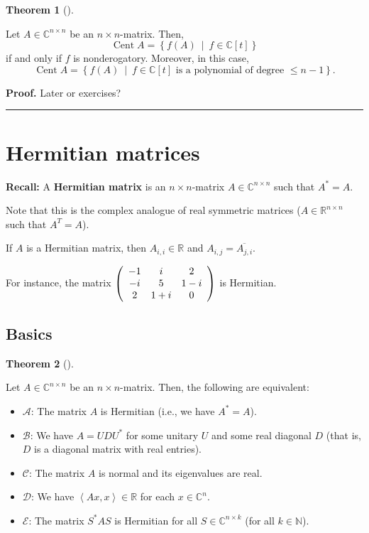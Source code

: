 \documentclass[numbers=enddot,12pt,final,onecolumn,notitlepage]{scrartcl}%
\newcounter{exer}
\numberwithin{exer}{subsection}
\theoremstyle{definition}
\newtheorem{theo}{Theorem}[subsection]
\newenvironment{theorem}[1][]
{\begin{theo}[#1]\begin{leftbar}}
{\end{leftbar}\end{theo}}
\newenvironment{proof}[1][Proof]{\noindent\textbf{#1.} }{\ \rule{0.5em}{0.5em}}
\begin{document}
\begin{theorem}
Let $A\in\mathbb{C}^{n\times n}$ be an $n\times n$-matrix. Then,
\[
\operatorname*{Cent}A=\left\{  f\left(  A\right)  \ \mid\ f\in\mathbb{C}%
\left[  t\right]  \right\}
\]
if and only if $f$ is nonderogatory. Moreover, in this case,%
\[
\operatorname*{Cent}A=\left\{  f\left(  A\right)  \ \mid\ f\in\mathbb{C}%
\left[  t\right]  \text{ is a polynomial of degree }\leq n-1\right\}  .
\]

\end{theorem}

\begin{proof}
Later or exercises?
\end{proof}

\section{Hermitian matrices}

\textbf{Recall:} A \textbf{Hermitian matrix} is an $n\times n$-matrix
$A\in\mathbb{C}^{n\times n}$ such that $A^{\ast}=A$.

Note that this is the complex analogue of real symmetric matrices
($A\in\mathbb{R}^{n\times n}$ such that $A^{T}=A$).

If $A$ is a Hermitian matrix, then $A_{i,i}\in\mathbb{R}$ and $A_{i,j}%
=\overline{A_{j,i}}$.

For instance, the matrix $\left(
\begin{array}
[c]{ccc}%
-1 & i & 2\\
-i & 5 & 1-i\\
2 & 1+i & 0
\end{array}
\right)  $ is Hermitian.

\subsection{Basics}

\begin{theorem}
\label{thm.herm.ABCDE}Let $A\in\mathbb{C}^{n\times n}$ be an $n\times
n$-matrix. Then, the following are equivalent:

\begin{itemize}
\item $\mathcal{A}$: The matrix $A$ is Hermitian (i.e., we have $A^{\ast}=A$).

\item $\mathcal{B}$: We have $A=UDU^{\ast}$ for some unitary $U$ and some real
diagonal $D$ (that is, $D$ is a diagonal matrix with real entries).

\item $\mathcal{C}$: The matrix $A$ is normal and its eigenvalues are real.

\item $\mathcal{D}$: We have $\left\langle Ax,x\right\rangle \in\mathbb{R}$
for each $x\in\mathbb{C}^{n}$.

\item $\mathcal{E}$: The matrix $S^{\ast}AS$ is Hermitian for all
$S\in\mathbb{C}^{n\times k}$ (for all $k\in\mathbb{N}$).
\end{itemize}
\end{theorem}
\end{document}
